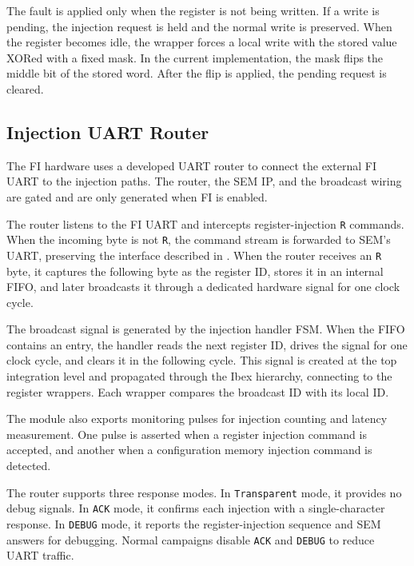 The fault is applied only when the register is not being written. If a write is pending, the injection request is held and the normal write is preserved. When the register becomes idle, the wrapper forces a local write with the stored value XORed with a fixed mask. In the current implementation, the mask flips the middle bit of the stored word. After the flip is applied, the pending request is cleared.




\subsection{Injection \ac{UART} Router}
\label{chap8:fi_coms}

The \ac{FI} hardware uses a developed \ac{UART} router to connect the external \ac{FI} \ac{UART} to the injection paths. The router, the \ac{SEM} \ac{IP}, and the broadcast wiring are gated and are only generated when \ac{FI} is enabled.

The router listens to the \ac{FI} \ac{UART} and intercepts register-injection \texttt{R} commands. When the incoming byte is not \texttt{R}, the command stream is forwarded to \ac{SEM}'s \ac{UART}, preserving the interface described in . When the router receives an \texttt{R} byte, it captures the following byte as the register ID, stores it in an internal FIFO, and later broadcasts it through a dedicated hardware signal for one clock cycle.

The broadcast signal is generated by the injection handler \ac{FSM}. When the FIFO contains an entry, the handler reads the next register ID, drives the signal for one clock cycle, and clears it in the following cycle. This signal is created at the top integration level and propagated through the Ibex hierarchy, connecting to the register wrappers. Each wrapper compares the broadcast ID with its local ID.

The module also exports monitoring pulses for injection counting and latency measurement. One pulse is asserted when a register injection command is accepted, and another when a configuration memory injection command is detected.

The router supports three response modes. In \texttt{Transparent} mode, it provides no debug signals. In \texttt{ACK} mode, it confirms each injection with a single-character response. In \texttt{DEBUG} mode, it reports the register-injection sequence and \ac{SEM} answers for debugging. Normal campaigns disable \texttt{ACK} and \texttt{DEBUG} to reduce \ac{UART} traffic.




